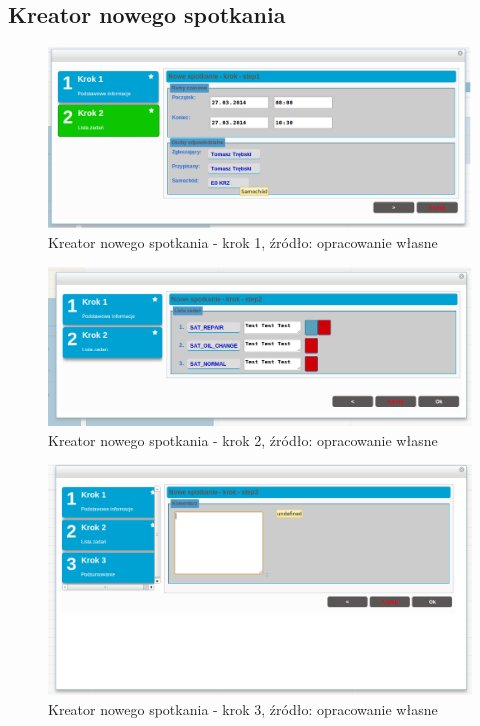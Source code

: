 \subsection{Kreator nowego spotkania}
	
	\begin{figure}[H]
		\centering
		\includegraphics[width=1.0\textwidth]{images/newAppointment_step1}
		\caption[Kreator nowego spotkania - krok 1]{
			Kreator nowego spotkania - krok 1, źródło: opracowanie własne
		}
		\label{app:wizard_newAppointment_step1}
	\end{figure}
	\begin{figure}[H]
		\centering
		\includegraphics[width=1.0\textwidth]{images/newAppointment_step2}
		\caption[Kreator nowego spotkania - krok 2]{
			Kreator nowego spotkania - krok 2, źródło: opracowanie własne
		}
		\label{app:wizard_newAppointment_step2}
	\end{figure}
	\begin{figure}[H]
		\centering
		\includegraphics[width=1.0\textwidth]{images/newAppointment_step3}
		\caption[Kreator nowego spotkania - krok 3]{
			Kreator nowego spotkania - krok 3, źródło: opracowanie własne
		}
		\label{app:wizard_newAppointment_step3}
	\end{figure}		
	
